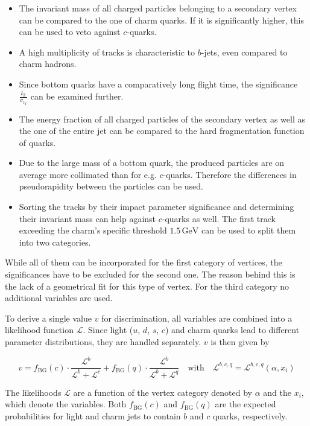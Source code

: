 \begin{itemize}
\item The invariant mass of all charged particles belonging to a secondary vertex can be compared to the one of charm quarks. If it is significantly higher, this can be used to veto against $c$-quarks.
\item A high multiplicity of tracks is characteristic to $b$-jets, even compared to charm hadrons.
\item Since bottom quarks have a comparatively long flight time, the significance $\frac{l_{\text{T}}}{\sigma_{l_{\text{T}}}}$ can be examined further.
\item The energy fraction of all charged particles of the secondary vertex as well as the one of the entire jet can be compared to the hard fragmentation function of quarks.
\item Due to the large mass of a bottom quark, the produced particles are on average more collimated than for e.g. $c$-quarks. Therefore the differences in pseudorapidity between the particles can be used.
\item Sorting the tracks by their impact parameter significance and determining their invariant mass can help against $c$-quarks as well. The first track exceeding the charm's specific threshold $1.5\,\text{GeV}$ can be used to split them into two categories.
\end{itemize}

\noindent While all of them can be incorporated for the first category of vertices, the significances have to be excluded for the second one. The reason behind this is the lack of a geometrical fit for this type of vertex. For the third category no additional variables are used.

To derive a single value $v$ for discrimination, all variables are combined into a likelihood function $\mathcal{L}$. Since light ($u$, $d$, $s$, $c$) and charm quarks lead to different parameter distributions, they are handled separately. $v$ is then given by

\begin{equation}
  \label{eq:btagdiscriminator}
  v = f_{\text{BG}}(c) \cdot \frac{\mathcal{L}^b}{\mathcal{L}^b + \mathcal{L}^c} + f_{\text{BG}}(q) \cdot \frac{\mathcal{L}^b}{\mathcal{L}^b + \mathcal{L}^q} \quad \text{with} \quad \mathcal{L}^{b, c, q} = \mathcal{L}^{b, c, q} (\alpha, x_i)
\end{equation}

\noindent The likelihoods $\mathcal{L}$ are a function of the vertex category denoted by $\alpha$ and the $x_i$, which denote the variables. Both $f_{\text{BG}}(c)$ and $f_{\text{BG}}(q)$ are the expected probabilities for light and charm jets to contain $b$ and $c$ quarks, respectively.


